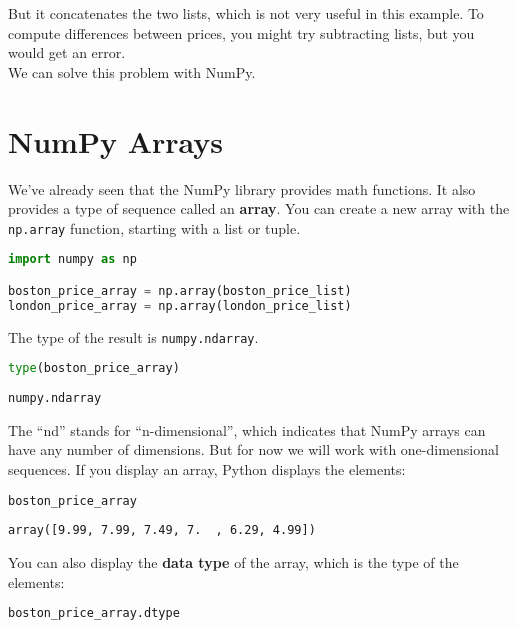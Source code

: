 But it concatenates the two lists, which is not very useful in this
example. To compute differences between prices, you might try
subtracting lists, but you would get an error.\\
We can solve this problem with NumPy.

\hypertarget{numpy-arrays}{%
\section{NumPy Arrays}\label{numpy-arrays}}

We've already seen that the NumPy library provides math functions. It
also provides a type of sequence called an \textbf{array}. You can
create a new array with the \passthrough{\lstinline!np.array!} function,
starting with a list or tuple.

\begin{lstlisting}[language=Python,style=source]
import numpy as np

boston_price_array = np.array(boston_price_list)
london_price_array = np.array(london_price_list)
\end{lstlisting}

The type of the result is \passthrough{\lstinline!numpy.ndarray!}.

\begin{lstlisting}[language=Python,style=source]
type(boston_price_array)
\end{lstlisting}

\begin{lstlisting}[style=output]
numpy.ndarray
\end{lstlisting}

The ``nd'' stands for ``n-dimensional'', which indicates that NumPy
arrays can have any number of dimensions. But for now we will work with
one-dimensional sequences. If you display an array, Python displays the
elements:

\begin{lstlisting}[language=Python,style=source]
boston_price_array
\end{lstlisting}

\begin{lstlisting}[style=output]
array([9.99, 7.99, 7.49, 7.  , 6.29, 4.99])
\end{lstlisting}

You can also display the \textbf{data type} of the array, which is the
type of the elements:

\begin{lstlisting}[language=Python,style=source]
boston_price_array.dtype
\end{lstlisting}

